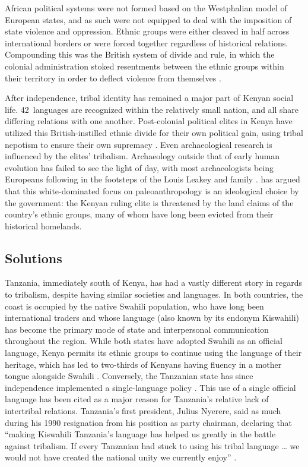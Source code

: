\documentclass[american]{../../../coursework}
\begin{document}
African political systems were not formed based on the Westphalian model of
European states, and as such were not equipped to deal with the imposition of
state violence and oppression. Ethnic groups were either cleaved in half
across international borders or were forced together regardless of historical
relations. Compounding this was the British system of divide and rule, in
which the colonial administration stoked resentments between the ethnic groups
within their territory in order to deflect violence from themselves
\parencite{Wesseling1996}.

After independence, tribal identity has remained a major part of Kenyan social
life. 42~languages are recognized within the relatively small nation, and all
share differing relations with one another. Post-colonial political elites in
Kenya have utilized this British-instilled ethnic divide for their own
political gain, using tribal nepotism to ensure their own supremacy
\parencite{Orvis2001}. Even archaeological research is influenced by the
elites' tribalism. Archaeology outside that of early human evolution has
failed to see the light of day, with most archaeologists being Europeans
following in the footsteps of the Louis Leakey and family \parencite{Koff1997}.
\textcite{Schmidt1995} has argued that this white-dominated focus on
paleoanthropology is an ideological choice by the government: the Kenyan
ruling elite is threatened by the land claims of the country's ethnic groups,
many of whom have long been evicted from their historical homelands.

\subsection{Solutions}

Tanzania, immediately south of Kenya, has had a vastly different story in
regards to tribalism, despite having similar societies and languages. In both
countries, the coast is occupied by the native Swahili population, who have
long been international traders and whose language (also known by its endonym
Kiswahili) has become the primary mode of state and interpersonal
communication throughout the region. While both states have adopted Swahili as
an official language, Kenya permits its ethnic groups to continue using the
language of their heritage, which has led to two-thirds of Kenyans having
fluency in a mother tongue alongside Swahili \parencite{Githiora2008}.
Conversely, the Tanzanian state has since independence implemented a
single-language policy \parencite{Topan2008}. This use of a single official
language has been cited as a major reason for Tanzania's relative lack of
intertribal relations. Tanzania's first president, Julius Nyerere, said as
much during his 1990 resignation from his position as party chairman,
declaring that ``making Kiswahili Tanzania's language has helped us greatly in
the battle against tribalism. If every Tanzanian had stuck to using his tribal
language … we would not have created the national unity we currently enjoy''
\parencites{Nyerere1990}[cited in][]{Topan2008}.
\end{document}
